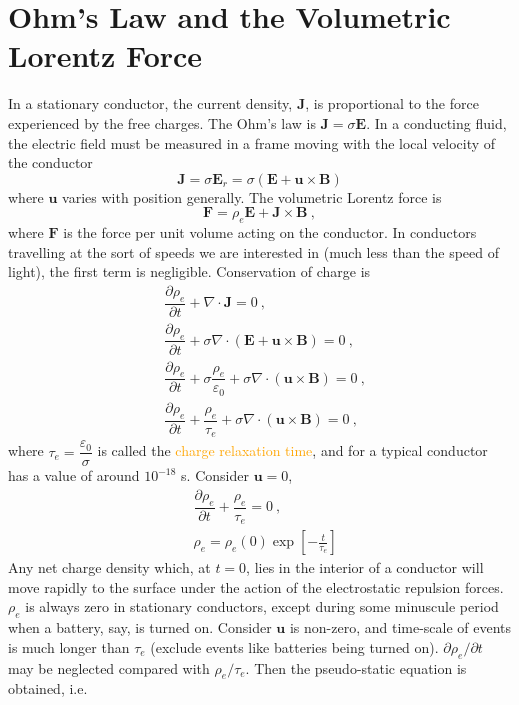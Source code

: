 \documentclass[12pt,a4paper]{article}
\renewcommand{\vec}[1]{\boldsymbol{#1}}
\begin{document}
\section{Ohm's Law and the Volumetric Lorentz Force}
In a stationary conductor, the current density, $\vec{J}$, is proportional to the force experienced by the free charges. The Ohm's law is $\vec{J} = \sigma \vec{E}$. In a conducting fluid, the electric field must be measured in a frame moving with the local velocity of the conductor
\begin{equation}
\vec{J} = \sigma \vec{E}_r = \sigma (\vec{E} +\vec{u}\times \vec{B})
\end{equation}
where $\vec{u}$ varies with position generally. The volumetric Lorentz force is
\begin{equation}
\vec{F} = \rho_e \vec{E} +\vec{J} \times \vec{B} ~,
\end{equation}
where $\vec{F}$ is the force per unit volume acting on the conductor. In conductors travelling at the sort of speeds we are interested in (much less than the speed of light), the first term is negligible. Conservation of charge is
\begin{align*}
& \dfrac{\partial \rho_e}{\partial t} +\nabla \cdot \vec{J} = 0 ~, \\
& \dfrac{\partial \rho_e}{\partial t} +\sigma \nabla \cdot  (\vec{E} +\vec{u}\times \vec{B}) = 0 ~, \\
& \dfrac{\partial \rho_e}{\partial t} +\sigma \dfrac{\rho_e}{\varepsilon_0} + \sigma \nabla \cdot (\vec{u}\times \vec{B}) = 0 ~, \\
& \dfrac{\partial \rho_e}{\partial t} +\dfrac{\rho_e}{\tau_e} + \sigma \nabla \cdot (\vec{u}\times \vec{B}) = 0 ~, 
\end{align*}
where $\tau_e = \dfrac{\varepsilon_0}{\sigma}$ is called the \textcolor{orange}{charge relaxation time}, and for a typical conductor has a value of around $10^{-18}$ s. Consider $\vec{u} = 0$,
\begin{align*}
& \dfrac{\partial \rho_e}{\partial t} +\dfrac{\rho_e}{\tau_e} = 0 ~, \\
& \rho_e = \rho_e(0) \exp \left[-\frac{t}{\tau_e} \right]
\end{align*}
Any net charge density which, at $t = 0$, lies in the interior of a conductor will move rapidly to the surface under the action of the electrostatic repulsion forces. $\rho_e$ is always zero in stationary conductors, except during some minuscule period when a battery, say, is turned on. Consider $\vec{u}$ is non-zero, and time-scale of events is much longer than $\tau_e$ (exclude events like batteries being turned on). $\partial \rho_e/\partial t$ may be neglected compared with $\rho_e/\tau_e$. Then the pseudo-static equation is obtained, i.e.
\end{document}
